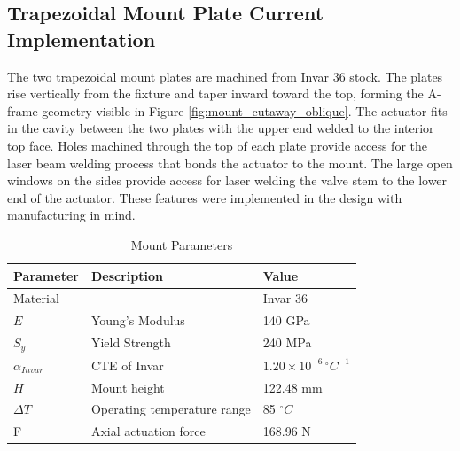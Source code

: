 \documentclass[12pt, letterpaper]{report}%
\newcounter{mycounter}           %
\newcounter{sub}[mycounter]      %
\newcommand{\degC}{^{\circ}C}    %
\begin{document}
        \subsection{Trapezoidal Mount Plate Current Implementation}
            The two trapezoidal mount plates are machined from Invar 36 stock. The plates rise vertically from the fixture and taper inward toward the top, forming the A-frame geometry visible in Figure \ref{fig:mount_cutaway_oblique}. The actuator fits in the cavity between the two plates with the upper end welded to the interior
            top face. Holes machined through the top of each plate provide access for the laser beam welding process that bonds the actuator to the mount. The large open windows on the sides provide access for laser welding the valve stem to the lower end of the actuator. These features were implemented in the design with manufacturing in mind.
            

             \begin{table}[H]
                \centering
                \caption{Mount Parameters}
                \label{tab:mount_parameters}
                \begin{tabularx}{\textwidth}{l X l}
                    \toprule
                    \textbf{Parameter} & \textbf{Description} & \textbf{Value} \\
                    \midrule
                    Material &
                    &
                    Invar 36
                        \\\addlinespace
                    $E$ &
                    Young's Modulus &
                    140 GPa
                    \\\addlinespace
                    $S_y$ &
                    Yield Strength &
                    240 MPa
                    \\\addlinespace
                    $\alpha_{Invar}$ &
                    CTE of Invar &
                    $1.20 \times 10^{-6} \, \degC ^{-1}$
                    \\\addlinespace
                    $H$ &
                    Mount height &
                    122.48 mm
                    \\\addlinespace
                    $\Delta{T}$ &
                    Operating temperature range &
                    85 $\degC$
                    \\\addlinespace
                    F &
                    Axial actuation force &
                    168.96 N
                    \\\bottomrule
                \end{tabularx}
            \end{table}           
\end{document}

